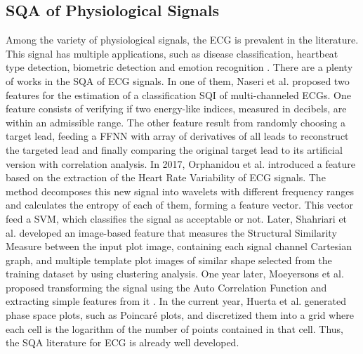 \subsection{\gls{SQA} of Physiological Signals}

Among the variety of physiological signals, the \gls{ECG} is prevalent in the literature. This signal has multiple applications, such as disease classification, heartbeat type detection, biometric detection and emotion recognition \cite{ecg-1}. There are a plenty of works in the \gls{SQA} of ECG signals. In one of them, Naseri et al. \cite{ecg-2} proposed two features for the estimation of a classification \gls{SQI} of multi-channeled \gls{ECG}s. One feature consists of verifying if two energy-like indices, measured in decibels, are within an admissible range. The other feature result from randomly choosing a target lead, feeding a \gls{FFNN} with array of derivatives of all leads to reconstruct the targeted lead and finally comparing the original target lead to its artificial version with correlation analysis. In 2017, Orphanidou et al. \cite{ecg-3} introduced a feature based on the extraction of the Heart Rate Variability of \gls{ECG} signals. The method decomposes this new signal into wavelets with different frequency ranges and calculates the entropy of each of them, forming a feature vector. This vector feed a \gls{SVM}, which classifies the signal as acceptable or not. Later, Shahriari et al. \cite{ecg-4} developed an image-based feature that measures the Structural Similarity Measure between the input plot image, containing each signal channel Cartesian graph, and multiple template plot images of similar shape selected from the training dataset by using clustering analysis. One year later, Moeyersons et al. \cite{ecg-5} proposed transforming the signal using the Auto Correlation Function and extracting simple features from it \cite{ecg-5}. In the current year, Huerta et al. \cite{ecg-6} generated phase space plots, such as Poincaré plots, and discretized them into a grid where each cell is the logarithm of the number of points contained in that cell. Thus, the \gls{SQA} literature for \gls{ECG} is already well developed.


